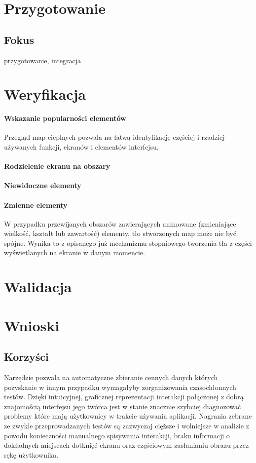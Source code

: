 \section{Przygotowanie}

\subsection{Fokus}
przygotowanie, integracja 

\section{Weryfikacja}

\paragraph{Wskazanie popularności elementów}
Przegląd map cieplnych pozwala na łatwą identyfikację częściej i rzadziej używanych funkcji, ekranów i elementów interfejsu.

\paragraph{Rodzielenie ekranu na obszary}


\paragraph{Niewidoczne elementy}


\paragraph{Zmienne elementy}
W przypadku przewijanych obszarów zawierających animowane (zmieniające wielkość, kształt lub zawartość) elementy, tło stworzonych map może nie być spójne. Wynika to z opisanego już mechanizmu stopniowego tworzenia tła z części wyświetlanych na ekranie w danym momencie.


\section{Walidacja}


\section{Wnioski}

\subsection{Korzyści}
Narzędzie pozwala na automatyczne zbieranie cennych danych których pozyskanie w innym przypadku wymagałyby zorganizowania czasochłonnych testów. Dzięki intuicyjnej, graficznej reprezentacji interakcji połączonej z dobrą znajomością interfejsu jego twórca jest w stanie znacznie szybciej diagnozować problemy które mają użytkownicy w trakcie używania aplikacji. Nagrania zebrane ze zwykle przeprowadzanych testów są zazwyczaj cięższe i wolniejsze w analizie z powodu konieczności manualnego spisywania interakcji, braku informacji o dokładnych miejscach dotknięć ekranu oraz częściowym zasłanianiu obrazu przez rękę użytkownika. 
